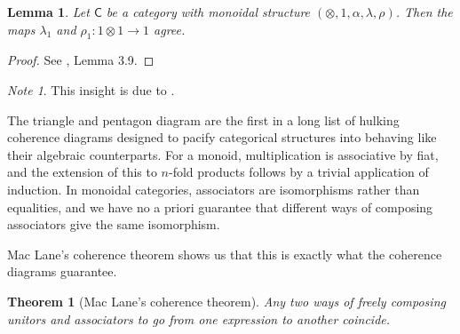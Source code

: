 \documentclass[a4paper,10pt]{scrreprt}
\newcommand{\Obj}{\mathrm{Obj}}
\theoremstyle{definition}
\theoremstyle{plain}
\newtheorem{theorem}{Theorem}[section]
\newtheorem{lemma}{Lemma}[section]
\theoremstyle{remark}
\newtheorem{note}{Note}[section]
\begin{document}
\begin{lemma}
  \label{lemma:leftandrightunitoragreewhenpossible}
  Let $\mathsf{C}$ be a category with monoidal structure $(\otimes, 1, \alpha, \lambda, \rho)$. Then the maps $\lambda_{1}$ and $\rho_{1}\colon 1 \otimes 1 \to 1$ agree.
\end{lemma}
\begin{proof}
  See \cite{nlab-deligne-theorem}, Lemma 3.9.
\end{proof}

%
%
\begin{note}
  This insight is due to \cite{unapolagetic-mathematician-mac-lanes-theorem}.

  The triangle and pentagon diagram are the first in a long list of hulking coherence diagrams designed to pacify categorical structures into behaving like their algebraic counterparts. For a monoid, multiplication is associative by fiat, and the extension of this to $n$-fold products follows by a trivial application of induction. In monoidal categories, associators are isomorphisms rather than equalities, and we have no a priori guarantee that different ways of composing associators give the same isomorphism. 

  Mac Lane's coherence theorem shows us that this is exactly what the coherence diagrams guarantee.
\end{note}

\begin{theorem}[Mac Lane's coherence theorem]
  Any two ways of freely composing unitors and associators to go from one expression to another coincide. 
\end{theorem}
\end{document}
